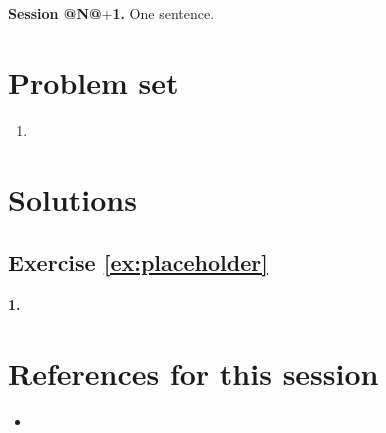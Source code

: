 \documentclass[11pt,a4paper]{article}
\begin{document}
\medskip
\noindent
\textbf{Session @N@$+$1.} One sentence.

\newpage
\section{Problem set}

\begin{exercise}[TITLE]\label{ex:placeholder}
\leavevmode
\begin{enumerate}[label=\textbf{\arabic*.}]
\item
\end{enumerate}
\end{exercise}

\ifsolutions
\newpage
\section{Solutions}

\subsection*{Exercise \ref{ex:placeholder}}

\textbf{1.}
\fi

\newpage
\section*{References for this session}

\begin{itemize}[leftmargin=*, itemsep=4pt]
\item
\end{itemize}
\end{document}
